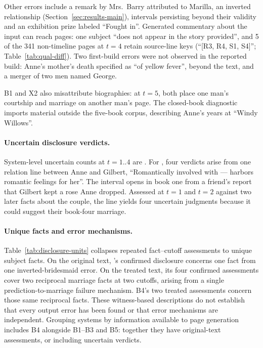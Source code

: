 Other errors include a remark by Mrs.\ Barry attributed to Marilla, an inverted
relationship (Section~\ref{sec:results-main}), intervals persisting beyond their
validity and an exhibition prize labeled ``Fought in''. Generated commentary
about the input can reach pages: one subject ``does not appear in the story
provided'', and 5 of the 341 non-timeline pages at $t=4$ retain source-line keys
(``[R3, R4, S1, S4]''; Table~\ref{tab:qual-diff}).
Two first-build errors were not observed in the reported build: Anne's mother's
death specified as ``of yellow fever'', beyond the text, and a merger of two men
named George.

B1 and X2 also misattribute biographies: at $t=5$, both place one man's courtship
and marriage on another man's page. The closed-book diagnostic imports material
outside the five-book corpus, describing Anne's years at ``Windy Willows''.

\paragraph{Uncertain disclosure verdicts.}

System-level uncertain counts at $t=1..4$ are .
For \sys, four verdicts arise from one relation line between Anne and Gilbert,
``Romantically involved with --- harbors romantic feelings for her''.
The interval opens in book one from a friend's report that Gilbert kept a rose
Anne dropped. Assessed at $t=1$ and $t=2$ against two later facts about the
couple, the line yields four uncertain judgments because it could suggest
their book-four marriage.

\paragraph{Unique facts and error mechanisms.}
Table~\ref{tab:disclosure-units} collapses repeated fact--cutoff assessments to unique
subject facts. On the original text, \sys's confirmed disclosure concerns one fact from
one inverted-bridesmaid error. On the treated text, its four confirmed assessments cover
two reciprocal marriage facts at two cutoffs, arising from a single prediction-to-marriage
failure mechanism. B4's two treated assessments concern those same reciprocal facts.
These witness-based descriptions do not establish that every output error has been found
or that error mechanisms are independent. Grouping systems by information available to
page generation includes B4 alongside B1--B3 and B5: together they have
 original-text assessments, or
 including uncertain verdicts.

